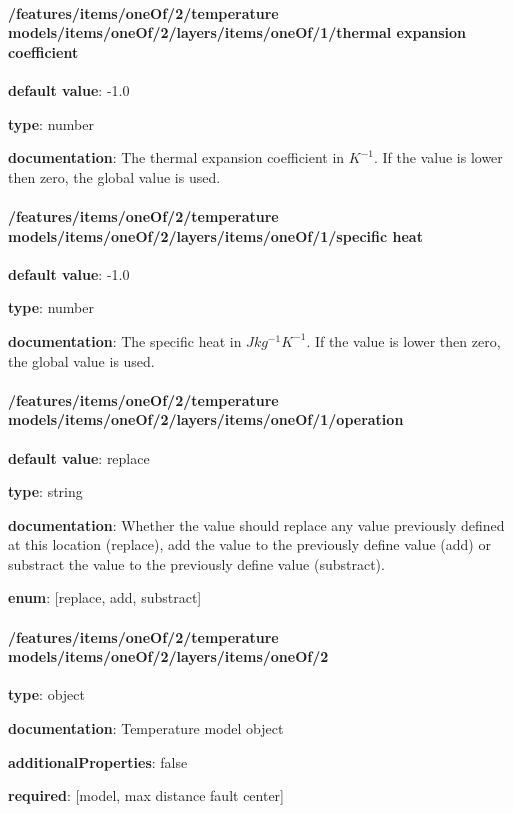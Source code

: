 \begin{itemized}
\end{itemized}\paragraph{/features/items/oneOf/2/temperature models/items/oneOf/2/layers/items/oneOf/1/thermal expansion coefficient} \begin{itemized}
\item {\bf default value}: -1.0
\item {\bf type}: number
\item {\bf documentation}: The thermal expansion coefficient in $K^{-1}$. If the value is lower then zero, the global value is used.
\end{itemized}\paragraph{/features/items/oneOf/2/temperature models/items/oneOf/2/layers/items/oneOf/1/specific heat} \begin{itemized}
\item {\bf default value}: -1.0
\item {\bf type}: number
\item {\bf documentation}: The specific heat in $J kg^{-1} K^{-1}$. If the value is lower then zero, the global value is used.
\end{itemized}\paragraph{/features/items/oneOf/2/temperature models/items/oneOf/2/layers/items/oneOf/1/operation} \begin{itemized}
\item {\bf default value}: replace
\item {\bf type}: string
\item {\bf documentation}: Whether the value should replace any value previously defined at this location (replace), add the value to the previously define value (add) or substract the value to the previously define value (substract).
\item {\bf enum}: [replace, add, substract]\end{itemized}\paragraph{/features/items/oneOf/2/temperature models/items/oneOf/2/layers/items/oneOf/2} \begin{itemized}
\item {\bf type}: object
\item {\bf documentation}: Temperature model object
\item {\bf additionalProperties}: false
\item {\bf required}: [model, max distance fault center]\end{itemized}
